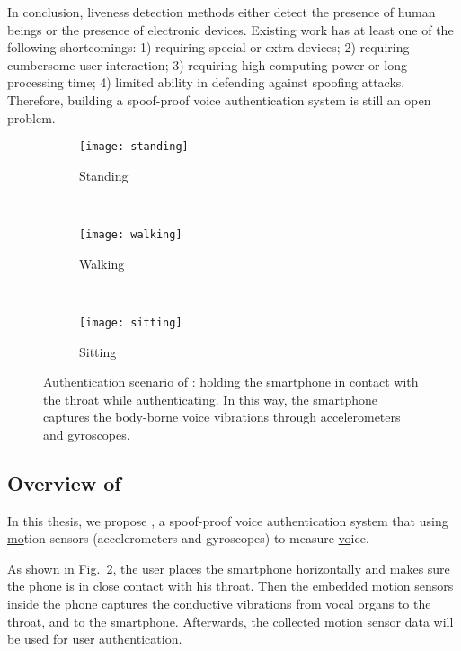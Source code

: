 In conclusion, liveness detection methods either detect the presence of human beings or the presence of electronic devices. Existing work has at least one of the following shortcomings: 1) requiring special or extra devices; 2) requiring cumbersome user interaction; 3) requiring high computing power or long processing time; 4) limited ability in defending against spoofing attacks. Therefore, building a spoof-proof voice authentication system is still an open problem.



\begin{figure}[!h]
	\centering
	\begin{subfigure}[b]{0.15\textwidth}
		\centering
		\texttt{[image: standing]}
		\caption{Standing}
	\end{subfigure}%
	~~~\qquad
	\begin{subfigure}[b]{0.15\textwidth}
		\centering
		\texttt{[image: walking]}
		\caption{Walking}
	\end{subfigure}
	~~~\qquad
	\begin{subfigure}[b]{0.15\textwidth}
		\centering
		\texttt{[image: sitting]}
		\caption{Sitting}\label{fig:usec}
	\end{subfigure}
	\caption[Authentication Scenario of {\shortname}]{Authentication scenario of {\shortname}: holding the smartphone in contact with the throat while authenticating. In this way, the smartphone captures the body-borne voice vibrations through accelerometers and gyroscopes.}
	\label{fig:use}
\end{figure}


\subsection{Overview of {\shortname}}

In this thesis, we propose {\shortname}, a spoof-proof voice authentication system that using \underline{mo}tion sensors (accelerometers and gyroscopes) to measure \underline{vo}ice.


As shown in Fig.~\ref{fig:use}, the user places the smartphone horizontally and makes sure the phone is in close contact with his throat. Then the embedded motion sensors inside the phone captures the conductive vibrations from vocal organs to the throat, and to the smartphone. Afterwards, the collected motion sensor data will be used for user authentication.


